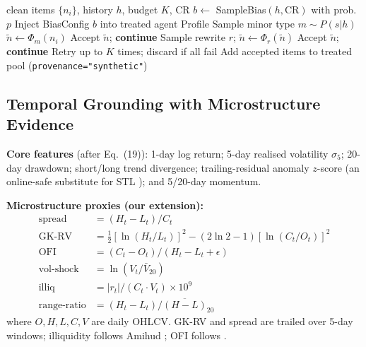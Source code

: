 \documentclass[conference]{IEEEtran}
\newcommand{\misgen}{MisGen}
\begin{document}
\begin{algorithm}[t]
\caption{\misgen{} generation for one trading day $t$}
\label{alg:misgen}
\begin{algorithmic}[1]
\Require clean items $\{n_i\}$, history $h$, budget $K$, CR
\State $b \leftarrow$ SampleBias$(h, \text{CR})$ with prob.\ $p$
\State Inject BiasConfig $b$ into treated agent Profile
  \State Sample minor type $m \sim P(s|h)$
  \State $\tilde{n} \leftarrow \Phi_m(n_i)$
    \State Accept $\tilde{n}$; \textbf{continue}
    \State Sample rewrite $r$; $\tilde{n} \leftarrow \Phi_r(\tilde{n})$
      \State Accept $\tilde{n}$; \textbf{continue}
    \EndIf
  \EndIf
  \State Retry up to $K$ times; discard if all fail
\EndFor
\State Add accepted items to treated pool (\texttt{provenance="synthetic"})
\end{algorithmic}
\end{algorithm}

\subsection{Temporal Grounding with Microstructure Evidence}
\label{sec:grounding}

\textbf{Core features} (after \cite{liu2026autoredtrader} Eq.~(19)):
1-day log return; 5-day realised volatility $\sigma_5$; 20-day drawdown;
short/long trend divergence; trailing-residual anomaly $z$-score
(an online-safe substitute for STL \cite{lopezdeprado2018advances});
and 5/20-day momentum.

\textbf{Microstructure proxies (our extension):}
\begin{align}
  \mathrm{spread}   &= (H_t - L_t) / C_t \\
  \mathrm{GK\text{-}RV} &= \tfrac{1}{2}[\ln(H_t/L_t)]^2
                    - (2\ln 2{-}1)[\ln(C_t/O_t)]^2 \\
  \mathrm{OFI}      &= (C_t - O_t) / (H_t - L_t + \epsilon) \\
  \mathrm{vol\text{-}shock} &= \ln(V_t / \bar{V}_{20}) \\
  \mathrm{illiq}    &= |r_t| / (C_t \cdot V_t) \times 10^9 \\
  \mathrm{range\text{-}ratio} &= (H_t{-}L_t) / \overline{(H{-}L)}_{20}
\end{align}
where $O, H, L, C, V$ are daily OHLCV.
GK-RV \cite{garman1980estimation} and spread \cite{corwin2012spread}
are trailed over 5-day windows; illiquidity follows Amihud
\cite{amihud2002illiquidity}; OFI follows \cite{cont2014price}.
\end{document}
